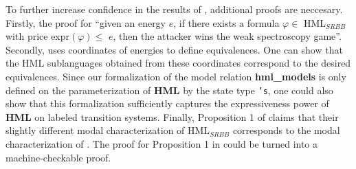 To further increase confidence in the results of \cite{bisping2023lineartimebranchingtime}, additional proofs are neccesary. Firstly, the proof for ``given an energy $e$, if there exists a formula $\varphi \in$ HML$_{SRBB}$ with price expr$(\varphi) \leq$ $e$, then the attacker wins the weak spectroscopy game''.
Secondly, \cite{bisping2023lineartimebranchingtime} uses coordinates of energies to define equivalences. One can show that the HML sublanguages obtained from these coordinates correspond to the desired equivalences.
Since our formalization of the model relation \textbf{hml\_models} is only defined on the parameterization of \textbf{HML} by the state type \texttt{'s}, one could also show that this formalization sufficiently captures the expressiveness power of \textbf{HML} on labeled transition systems.
Finally, Proposition 1 of \cite{bisping2023lineartimebranchingtime} claims that their slightly different modal characterization of HML$_{SRBB}$ corresponds to the modal characterization of \cite{FOKKINK2019104435}. 
The proof for Proposition 1 in \cite{bisping2023lineartimebranchingtime} could be turned into a machine-checkable proof. 